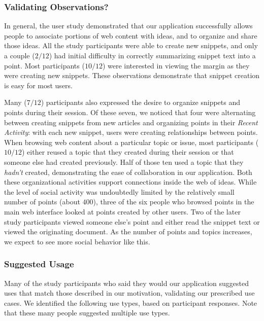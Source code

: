 \documentclass{chi2009}
\begin{document}

\subsubsection{Validating Observations?}
In general, the user study demonstrated that our application successfully allows people to associate portions of web content with ideas, and to organize and share those ideas. All the study participants were able to create new snippets, and only a couple ($2/12$) had initial difficulty in correctly summarizing snippet text into a point. Most participants ($10/12$) were interested in viewing the margin as they were creating new snippets. These observations demonstrate that snippet creation is easy for most users.

Many ($7/12$) participants also expressed the desire to organize snippets and points during their session. Of these seven, we noticed that four were alternating between creating snippets from new articles and organizing points in their {\it Recent Activity}: with each new snippet, users were creating relationships between points. When browsing web content about a particular topic or issue, most participants ($10/12$) either reused a topic that they created during their session or that someone else had created previously. Half of those ten used a topic that they {\it hadn't} created, demonstrating the ease of collaboration in our application. Both these organizational activities support connections inside the web of ideas. While the level of social activity was undoubtedly limited by the relatively small number of points (about $400$), three of the six people who browsed points in the main web interface looked at points created by other users. Two of the later study participants viewed someone else's point and either read the snippet text or viewed the originating document. As the number of points and topics increases, we expect to see more social behavior like this.


\subsubsection{Suggested Usage}
Many of the study participants who said they would our application suggested uses that match those described in our motivation, validating our prescribed use cases.  We identified the following use types, based on participant responses. Note that these many people suggested multiple use types.
\end{document}
